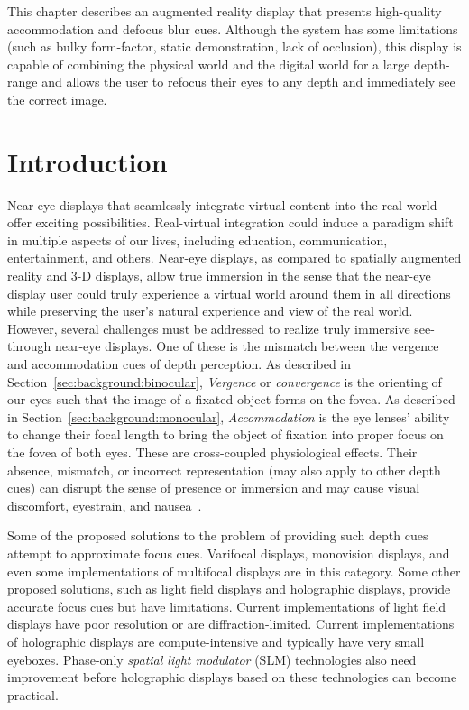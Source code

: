 This chapter describes an augmented reality display that presents high-quality accommodation and defocus blur cues. Although the system has some limitations (such as bulky form-factor, static demonstration, lack of occlusion), this display is capable of combining the physical world and the digital world for a large depth-range and allows the user to refocus their eyes to any depth and immediately see the correct image. 

\section{Introduction}
\label{sec:volumetric:introduction}

Near-eye displays that seamlessly integrate virtual content into the real world offer exciting possibilities. 
Real-virtual integration could induce a paradigm shift in multiple aspects of our lives, including education, communication, entertainment, and others. 
Near-eye displays, as compared to spatially augmented reality and 3-D displays, allow true immersion in the sense that the near-eye display user could truly experience a virtual world around them in all directions while preserving the user's natural experience and view of the real world. 
However, several challenges must be addressed to realize truly immersive see-through near-eye displays. 
One of these is the mismatch between the vergence and accommodation cues of depth perception. 
As described in Section~\ref{sec:background:binocular}, \emph{Vergence} or \emph{convergence} is the orienting of our eyes such that the image of a fixated object forms on the fovea. 
As described in Section~\ref{sec:background:monocular}, \emph{Accommodation} is the eye lenses' ability to change their focal length to bring the object of fixation into proper focus on the fovea of both eyes. 
These are cross-coupled physiological effects. 
Their absence, mismatch, or incorrect representation (may also apply to other depth cues) can disrupt the sense of presence or immersion and may cause visual discomfort, eyestrain, and nausea~\cite{Hoffman2008Vergence}. 

Some of the proposed solutions to the problem of providing such depth cues attempt to approximate focus cues. Varifocal displays, monovision displays, and even some implementations of multifocal displays are in this category. Some other proposed solutions, such as light field displays and holographic displays, provide accurate focus cues but have limitations. Current implementations of light field displays have poor resolution or are diffraction-limited. Current implementations of holographic displays are compute-intensive and typically have very small eyeboxes. Phase-only \emph{spatial light modulator} (SLM) technologies also need improvement before holographic displays based on these technologies can become practical.

